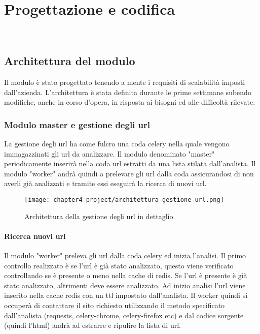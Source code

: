 
\chapter{Progettazione e codifica}
\label{cap:progettazione-codifica}

\\

\section{Architettura del modulo}

Il modulo è stato progettato tenendo a mente i requisiti di scalabilità imposti dall'azienda. L'architettura è stata definita durante le prime settimane subendo modifiche, anche in corso d'opera, in risposta ai bisogni ed alle difficoltà rilevate.

\subsection{Modulo master e gestione degli url}

La gestione degli url ha come fulcro una coda celery nella quale vengono immagazzinati gli url da analizzare. Il modulo denominato "master" periodicamente inserirà nella coda url estratti da una lista stilata dall'analista. Il modulo "worker" andrà quindi a prelevare gli url dalla coda assicurandosi di non averli già analizzati e tramite essi eseguirà la ricerca di nuovi url. 


\begin{figure}[!h] 
    \centering 
    \texttt{[image: chapter4-project/architettura-gestione-url.png]} 
    \caption{Architettura della gestione degli url in dettaglio.}
\end{figure}

\subsubsection{Ricerca nuovi url}

Il modulo "worker" preleva gli url dalla coda celery ed inizia l'analisi. Il primo controllo realizzato è se l'url è già stato analizzato, questo viene verificato controllando se è presente o meno nella cache di redis. Se l'url è presente è già stato analizzato, altrimenti deve essere analizzato. Ad inizio analisi l'url viene inserito nella cache redis con un ttl impostato dall'analista. Il worker quindi si occuperà di contattare il sito richiesto utilizzando il metodo specificato dall'analista (requests, celery-chrome, celery-firefox etc) e dal codice sorgente (quindi l'html) andrà ad estrarre e ripulire la lista di url. 


